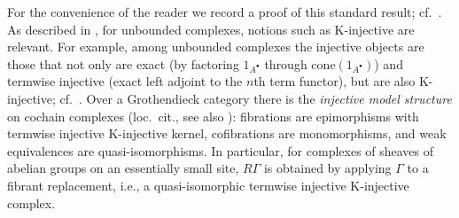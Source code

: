 \documentclass[12pt,reqno]{amsart}
\theoremstyle{plain}
\theoremstyle{remark}
\theoremstyle{definition}
\numberwithin{equation}{section}
\begin{document}
For the convenience of the reader we record a proof of this standard result; cf.\ \cite[Thm.\ 4.12]{ayoub}.
As described in \cite{spaltenstein}, for unbounded complexes, notions such as $\mathrm{K}$-injective are relevant.
For example, among unbounded complexes the injective objects are those that not only are exact (by factoring $1_{A^\bullet}$
through $\mathrm{cone}(1_{A^\bullet})$) and termwise injective (exact left adjoint to the $n$th term functor), but are also $\mathrm{K}$-injective; cf.\ \cite[Exa.\ 3.2]{hoveyreptheory}.
Over a Grothendieck category
there is the \emph{injective model structure} on cochain complexes
(loc.\ cit., see also \cite{beke}):
fibrations are epimorphisms with termwise injective $\mathrm{K}$-injective kernel,
cofibrations are monomorphisms,
and weak equivalences are quasi-isomorphisms.
In particular, for complexes of sheaves of abelian groups on an essentially small site,
$R\Gamma$ is obtained by applying $\Gamma$ to
a fibrant replacement, i.e., a quasi-isomorphic
termwise injective $\mathrm{K}$-injective complex.
\end{document}
